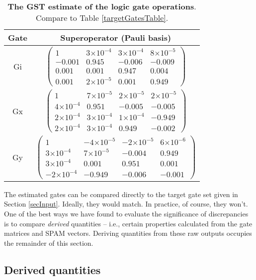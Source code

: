 \documentclass{article}[11pt]
\providecommand{\e}[1]{\ensuremath{\times 10^{#1}}}
\begin{document}
\begin{table}[h]
\begin{center}
\begin{tabular}[l]{|c|c|}
\hline
Gate & Superoperator (Pauli basis) \\ \hline
Gi & $ \left(\!\!\begin{array}{cccc}
1 & 3\e{-4} & 3\e{-4} & 8\e{-5} \\ 
-0.001 & 0.945 & -0.006 & -0.009 \\ 
0.001 & 0.001 & 0.947 & 0.004 \\ 
0.001 & 2\e{-5} & 0.001 & 0.949
 \end{array}\!\!\right) $
 \\ \hline
Gx & $ \left(\!\!\begin{array}{cccc}
1 & 7\e{-5} & 2\e{-5} & 2\e{-5} \\ 
4\e{-4} & 0.951 & -0.005 & -0.005 \\ 
2\e{-4} & 3\e{-4} & 1\e{-4} & -0.949 \\ 
2\e{-4} & 3\e{-4} & 0.949 & -0.002
 \end{array}\!\!\right) $
 \\ \hline
Gy & $ \left(\!\!\begin{array}{cccc}
1 & -4\e{-5} & -2\e{-5} & 6\e{-6} \\ 
3\e{-4} & 7\e{-5} & -0.004 & 0.949 \\ 
3\e{-4} & 0.001 & 0.951 & 0.001 \\ 
-2\e{-4} & -0.949 & -0.006 & -0.001
 \end{array}\!\!\right) $
 \\ \hline
\end{tabular}

\caption{\textbf{The GST estimate of the logic gate operations}.  Compare to Table \ref{targetGatesTable}.\label{bestGatesetGatesTable}}
\end{center}
\end{table}

The estimated gates can be compared directly to the target gate set given in Section \ref{secInput}.  Ideally, they would match.  In practice, of course, they won't.  One of the best ways we have found to evaluate the significance of discrepancies is to compare \emph{derived} quantities -- i.e., certain properties calculated from the gate matrices and SPAM vectors.  Deriving quantities from these raw outputs occupies the remainder of this section.
\clearpage

\subsection{Derived quantities\label{derivedQtySection}}
\end{document}
